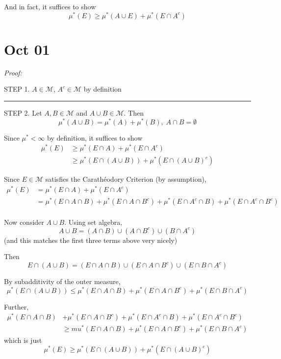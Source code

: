 \documentclass[12pt]{report}
\newcommand{\M}{\mathcal{M}}
\renewcommand{\div}{\vspace*{10pt}\hrule\vspace*{10pt}}
\newenvironment*{tbox}[2][gray]{
    \begin{tcolorbox}[
        parbox=false,
        colback=#1!5!white,
        colframe=#1!75!black,
        breakable,
        title={#2}
    ]}
    {\end{tcolorbox}}
\begin{document}
        And in fact, it suffices to show 
        \[\mu^*(E) \geq \mu^*(A \cup E) + \mu^*(E\cap A^c)\] 


\section{Oct 01}

    \begin{tbox}{\textbf{Carathéodory Procedure:} If $\mu^*$ is an outer measure and $\M$ are $\mu^*$-measurable sets, then $\M$ is a $\sigma$-algebra and $\mu^*\big\vert_{\M}$ is a measure on $\M$}
        
        \emph{Proof:} 

        STEP 1. $A \in \M$, $A^c \in \M$ by definition

        \div 

        STEP 2. Let $A, B \in \M$ and $A \cup B \in \M$. Then 
        \[\mu^*(A \cup B) = \mu^*(A) + \mu^*(B), \; A \cap B = \emptyset\]

        Since $\mu^* < \infty$ by definition, it suffices to show 
        \begin{align*}
            \mu^*(E) &\geq \mu^*(E \cap A) + \mu^*(E \cap A^c)\\ 
            &\geq \mu^*(E \cap (A \cup B)) + \mu^*(E \cap (A \cup B)^c)
        \end{align*}

        Since $E \in \M$ satisfies the Carathéodory Criterion (by assumption), 
        \begin{align*}
            \mu^*(E) &= \mu^*(E \cap A) + \mu^*(E \cap A^c)\\ 
            &= \mu^*(E \cap A \cap B) + \mu^*(E \cap A \cap B^c) + \mu^*(E \cap A^c \cap B) + \mu^*(E \cap A^c \cap B^c)\\
        \end{align*}
        
        Now consider $A \cup B$. Using set algebra, 
        \[A \cup B = (A \cap B) \cup (A \cap B^c) \cup (B \cap A^c)\]
        (and this matches the first three terms above very nicely)

        Then 
        \[E \cap (A \cup B) = (E \cap A \cap B) \cup (E \cap A \cap B^c) \cup (E \cap B \cap A^c)\]
        
        By subadditivity of the outer measure, 
        \[\mu^*(E \cap (A \cup B)) \leq \mu^*(E \cap A \cap B) + \mu^*(E \cap A \cap B^c) + \mu^*(E \cap B \cap A^c)\]

        Further, 
        \begin{align*}
            \mu^*(E \cap A \cap B) &+ \mu^*(E \cap A \cap B^c) + \mu^*(E \cap A^c \cap B) + \mu^*(E \cap A^c \cap B^c)\\ 
                &\geq mu^*(E \cap A \cap B) + \mu^*(E \cap A \cap B^c) + \mu^*(E \cap B \cap A^c)
        \end{align*}
        which is just 
        \[\mu^*(E) \geq \mu^*(E \cap (A\cup B)) + \mu^*(E \cap (A \cup B)^c)\]


\end{tbox}
\end{document}
